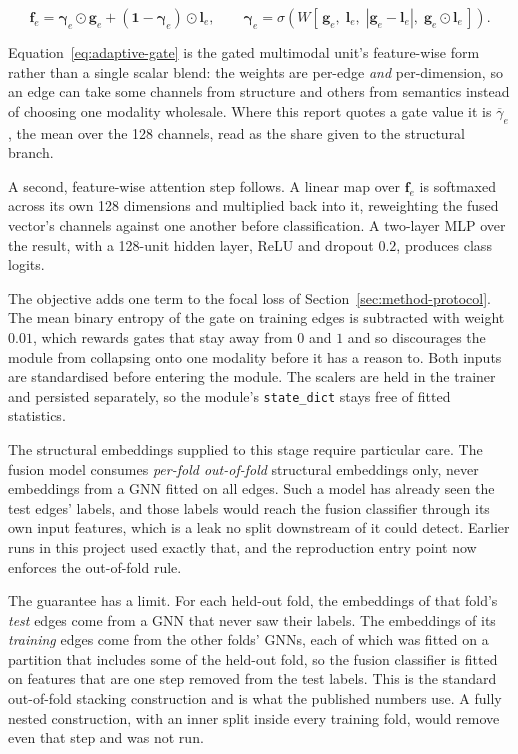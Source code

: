\begin{equation}
\label{eq:adaptive-gate}
\mathbf{f}_{e}
= \boldsymbol{\gamma}_{e} \odot \mathbf{g}_{e}
+ \left(\mathbf{1} - \boldsymbol{\gamma}_{e}\right) \odot \mathbf{l}_{e},
\qquad
\boldsymbol{\gamma}_{e} = \sigma\!\left(
W\left[\,\mathbf{g}_{e},\; \mathbf{l}_{e},\;
\left|\mathbf{g}_{e}-\mathbf{l}_{e}\right|,\;
\mathbf{g}_{e}\odot\mathbf{l}_{e}\,\right]\right) .
\end{equation}

Equation~\eqref{eq:adaptive-gate} is the gated multimodal unit's feature-wise form \citep{arevalo2017gmu} rather than a single
scalar blend: the weights are per-edge \emph{and} per-dimension, so an edge can take some channels
from structure and others from semantics instead of choosing one modality wholesale. Where this
report quotes a gate value it is $\overline{\gamma}_{e}$, the mean over the 128 channels, read as
the share given to the structural branch.

A second, feature-wise attention step follows. A linear map over $\mathbf{f}_{e}$ is softmaxed
across its own 128 dimensions and multiplied back into it, reweighting the fused vector's channels
against one another before classification. A two-layer MLP over the result, with a 128-unit hidden
layer, ReLU and dropout $0.2$, produces class logits.

The objective adds one term to the focal loss of Section~\ref{sec:method-protocol}. The mean
binary entropy of the gate on training edges is subtracted with weight $0.01$, which rewards
gates that stay away from $0$ and $1$ and so discourages the module from collapsing onto one
modality before it has a reason to. Both inputs are standardised before entering the
module. The scalers are held in the trainer and persisted separately, so the module's
\texttt{state\_dict} stays free of fitted statistics.

The structural embeddings supplied to this stage require particular care. The fusion model consumes \emph{per-fold
out-of-fold} structural embeddings only, never embeddings from a GNN fitted on all edges. Such a
model has already seen the test edges' labels, and those labels would reach the fusion
classifier through its own input features, which is a leak no split downstream of it could
detect. Earlier runs in this project used exactly that, and the reproduction entry point now
enforces the out-of-fold rule.

The guarantee has a limit. For each held-out fold, the embeddings of that fold's \emph{test} edges come from
a GNN that never saw their labels. The embeddings of its \emph{training} edges come from the
other folds' GNNs, each of which was fitted on a partition that includes some of the held-out
fold, so the fusion classifier is fitted on features that are one step removed from the test
labels. This is the standard out-of-fold stacking construction and is what the published
numbers use. A fully nested construction, with an inner split inside every training fold, would
remove even that step and was not run.

